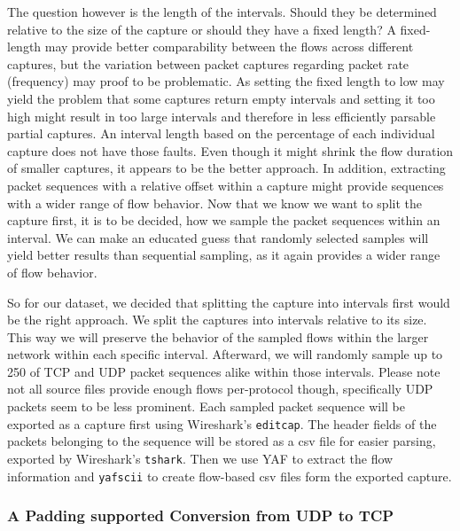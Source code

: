 \documentclass[
	ngerman,
	ruledheaders=section,%
	class=report,%
	thesis={type=bachelor},%
	accentcolor=9c,%
	custommargins=true,%
	marginpar=false,%
	parskip=half-,%
	fontsize=11pt,%
	twoside
]{tudapub}
\let\code\texttt
\begin{document}
The question however is the length of the intervals.
Should they be determined relative to the size of the capture or should they have a fixed length?
A fixed-length may provide better comparability between the flows across different captures,
but the variation between packet captures regarding packet rate (frequency) may proof to be problematic.
As setting the fixed length to low may yield the problem that some captures return empty intervals
and setting it too high might result in too large intervals and therefore in less efficiently parsable partial captures.
An interval length based on the percentage of each individual capture does not have those faults.
Even though it might shrink the flow duration of smaller captures, it appears to be the better approach.
In addition, extracting packet sequences with a relative offset within a capture might provide sequences with a wider range of flow behavior.
Now that we know we want to split the capture first, it is to be decided, how we sample the packet sequences within an interval.
We can make an educated guess that randomly selected samples will yield better results than sequential sampling, as it again provides a wider range of flow behavior.

So for our dataset, we decided that splitting the capture into intervals first would be the right approach.
We split the captures into intervals relative to its size.
This way we will preserve the behavior of the sampled flows within the larger network within each specific interval.
Afterward, we will randomly sample up to 250 of TCP and UDP packet sequences alike within those intervals.
Please note not all source files provide enough flows per-protocol though, specifically UDP packets seem to be less prominent.
Each sampled packet sequence will be exported as a capture first using Wireshark's \code{editcap}.
The header fields of the packets belonging to the sequence will be stored as a csv file for easier parsing, exported by Wireshark's \code{tshark}.
Then we use YAF to extract the flow information and \code{yafscii} to create flow-based csv files form the exported capture.

\subsubsection{A Padding supported Conversion from UDP to TCP}
\label{sec:UDPpadding}
\end{document}
